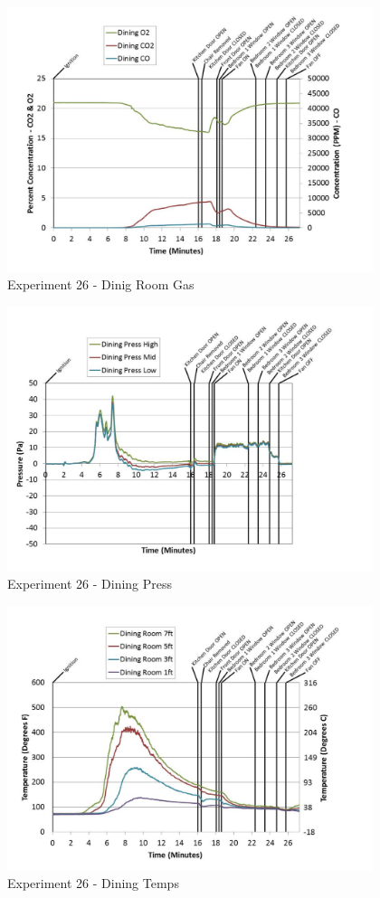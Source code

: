 \documentclass{article}
\begin{document}
\begin{appendices}
	\begin{figure}[h!]
		\centering
		\includegraphics[height=3.05in]{0_Images/Results_Charts/Exp_26_Charts/DinigRoomGas.pdf}
		\caption{Experiment 26 - Dinig Room Gas}
	\end{figure}
 
	\clearpage

	\begin{figure}[h!]
		\centering
		\includegraphics[height=3.05in]{0_Images/Results_Charts/Exp_26_Charts/DiningPress.pdf}
		\caption{Experiment 26 - Dining Press}
	\end{figure}
 

	\begin{figure}[h!]
		\centering
		\includegraphics[height=3.05in]{0_Images/Results_Charts/Exp_26_Charts/DiningTemps.pdf}
		\caption{Experiment 26 - Dining Temps}
	\end{figure}
 

\end{appendices}
\end{document}
